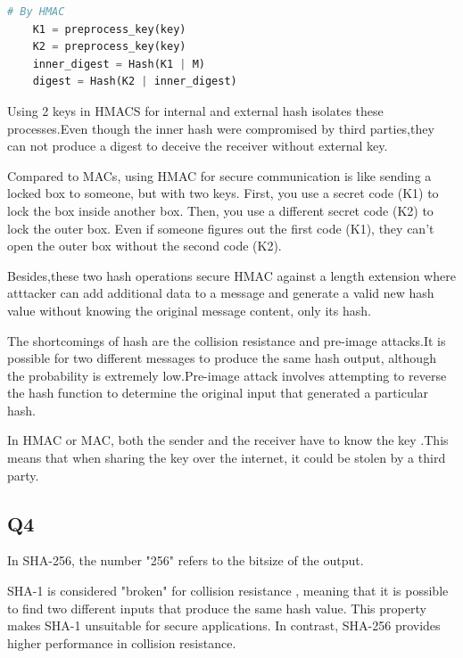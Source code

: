 \documentclass{article}
\begin{document}
	\begin{lstlisting}[language=Python]
	# By HMAC 
	K1 = preprocess_key(key)
	K2 = preprocess_key(key)
	inner_digest = Hash(K1 | M)
	digest = Hash(K2 | inner_digest)
	\end{lstlisting}

	Using 2 keys in HMACS for internal and external hash isolates these processes.Even though the inner hash were compromised by third parties,they can not produce a digest to deceive the receiver without external key.

	Compared to MACs, using HMAC for secure communication is like sending a locked box to someone, but with two keys. First, you use a secret code (K1) to lock the box inside another box. Then, you use a different secret code (K2) to lock the outer box. Even if someone figures out the first code (K1), they can't open the outer box without the second code (K2).

	Besides,these two hash operations secure HMAC against a length extension where atttacker can add additional data to a message and generate a valid new hash value without knowing the original message content, only its hash\cite{DeepRND_LengthExtension}.

	The shortcomings of hash are the collision resistance and pre-image attacks\cite{2-1-1.Hash(1)}.It is possible for two different messages to produce the same hash output, although the probability is extremely low.Pre-image attack involves attempting to reverse the hash function to determine the original input that generated a particular hash.

	In HMAC or MAC, both the sender and the receiver have to know the key .This means that when sharing the key over the internet, it could be stolen by a third party.


\subsection{Q4}

In SHA-256, the number "256" refers to the bitsize of the output\cite{SSLDragonSHA256}.

SHA-1 is considered "broken" for collision resistance \cite{2-1-1.Hash(1)}, meaning that it is possible to find two different inputs that produce the same hash value. This property makes SHA-1 unsuitable for secure applications. In contrast, SHA-256 provides higher performance in collision resistance.\\\\
\end{document}
